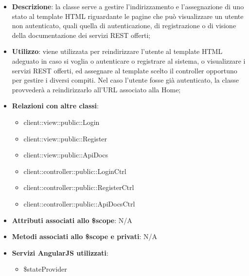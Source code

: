 		\begin{itemize}
			\item \textbf{Descrizione}: la classe serve a gestire l'indirizzamento e l'assegnazione di uno stato al template HTML riguardante le pagine che può visualizzare un utente non autenticato, quali quella di autenticazione, di registrazione o di visione della documentazione dei servizi REST offerti;
			\item \textbf{Utilizzo}: viene utilizzata per reindirizzare l'utente al template HTML adeguato in caso si voglia o autenticare o registrare al sistema, o visualizzare i servizi REST offerti, ed assegnare al template scelto il controller opportuno per gestire i diversi compiti. Nel caso l'utente fosse già autenticato, la classe provvederà a reindirizzarlo all'URL associato alla Home;
			\item \textbf{Relazioni con altre classi}:
				\begin{itemize}
					\item client::view::public::Login
					\item client::view::public::Register
					\item client::view::public::ApiDocs
					\item client::controller::public::LoginCtrl
					\item client::controller::public::RegisterCtrl
					\item client::controller::public::ApiDocsCtrl
				\end{itemize}
				\item \textbf{Attributi associati allo \$scope}: N/A
				\item \textbf{Metodi associati allo \$scope e privati}: N/A
				\item \textbf{Servizi AngularJS utilizzati}:
					\begin{itemize}
						\item \$stateProvider
					\end{itemize}
		\end{itemize}

